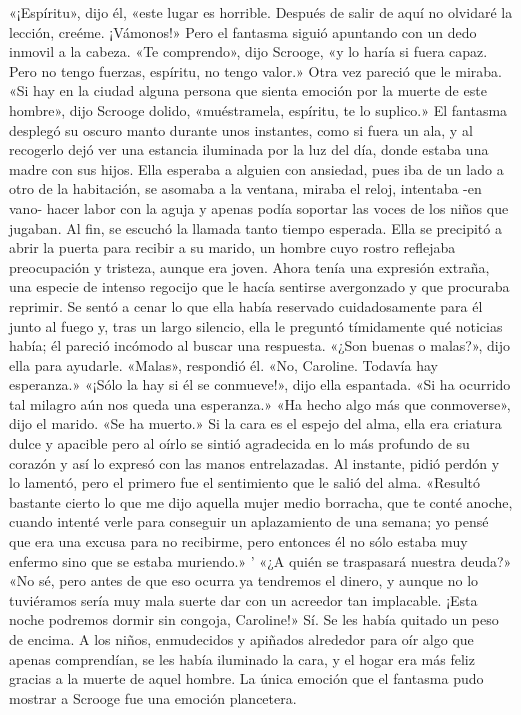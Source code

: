 \documentclass{novela}
\begin{document}
 «¡Espíritu», dijo él, «este lugar es horrible. Después de salir de aquí no olvidaré la lección, creéme. ¡Vámonos!»
 Pero el fantasma siguió apuntando con un dedo inmovil a la cabeza.
 «Te comprendo», dijo Scrooge, «y lo haría si fuera capaz. Pero no tengo fuerzas, espíritu, no tengo valor.»
 Otra vez pareció que le miraba.
 «Si hay en la ciudad alguna persona que sienta emoción por la muerte de este hombre», dijo Scrooge dolido, «muéstramela, espíritu, te lo suplico.»
 El fantasma desplegó su oscuro manto durante unos instantes, como si fuera un ala, y al recogerlo dejó ver una estancia iluminada por la luz del día, donde estaba una madre con sus hijos.
 Ella esperaba a alguien con ansiedad, pues iba de un lado a otro de la habitación, se asomaba a la ventana, miraba el reloj, intentaba -en vano- hacer labor con la aguja y apenas podía soportar las voces de los niños que jugaban.
 Al fin, se escuchó la llamada tanto tiempo esperada. Ella se precipitó a abrir la puerta para recibir a su marido, un hombre cuyo rostro reflejaba preocupación y tristeza, aunque era joven. Ahora tenía una expresión extraña, una especie de intenso regocijo que le hacía sentirse avergonzado y que procuraba reprimir.
 Se sentó a cenar lo que ella había reservado cuidadosamente para él junto al fuego y, tras un largo silencio, ella le preguntó tímidamente qué noticias había; él pareció incómodo al buscar una respuesta.
 «¿Son buenas o malas?», dijo ella para ayudarle.
 «Malas», respondió él.
 «No, Caroline. Todavía hay esperanza.»
 «¡Sólo la hay si él se conmueve!», dijo ella espantada. «Si ha ocurrido tal milagro aún nos queda una esperanza.»
 «Ha hecho algo más que conmoverse», dijo el marido. «Se ha muerto.»
 Si la cara es el espejo del alma, ella era criatura dulce y apacible pero al oírlo se sintió agradecida en lo más profundo de su corazón y así lo expresó con las manos entrelazadas. Al instante, pidió perdón y lo lamentó, pero el primero fue el sentimiento que le salió del alma.
 «Resultó bastante cierto lo que me dijo aquella mujer medio borracha, que te conté anoche, cuando intenté verle para conseguir un aplazamiento de una semana; yo pensé que era una excusa para no recibirme, pero entonces él no sólo estaba muy enfermo sino que se estaba muriendo.»
 ' «¿A quién se traspasará nuestra deuda?»
 «No sé, pero antes de que eso ocurra ya tendremos el dinero, y aunque no lo tuviéramos sería muy mala suerte dar con un acreedor tan implacable. ¡Esta noche podremos dormir sin congoja, Caroline!»
 Sí. Se les había quitado un peso de encima. A los niños, enmudecidos y apiñados alrededor para oír algo que apenas comprendían, se les había iluminado la cara, y el hogar era más feliz gracias a la muerte de aquel hombre. La única emoción que el fantasma pudo mostrar a Scrooge fue una emoción plancetera.
\end{document}
